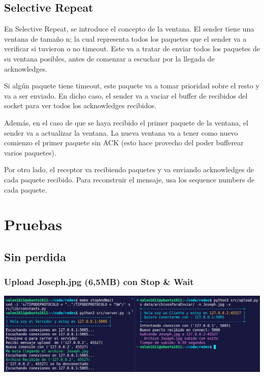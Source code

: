 \documentclass{article}
\begin{document}
\subsection{Selective Repeat}\label{selective-repeat}

En Selective Repeat, se introduce el concepto de la ventana. El sender tiene una ventana de tamaño n; la cual representa todos los paquetes que el sender va a verificar si tuvieron o no timeout. Este va a tratar de enviar todos los paquetes de su ventana posibles, antes de comenzar a escuchar por la llegada de acknowledges.

Si algún paquete tiene timeout, este paquete va a tomar prioridad sobre el resto y va a ser enviado. En dicho caso, el sender va a vaciar el buffer de recibidos del socket para ver todos los acknowledges recibidos.

Además, en el caso de que se haya recibido el primer paquete de la ventana, el sender va a actualizar la ventana. La nueva ventana va a tener como nuevo comienzo el primer paquete sin ACK (esto hace provecho del poder bufferear varios paquetes).

Por otro lado, el receptor va recibiendo paquetes y va enviando acknowledges de cada paquete recibido. Para reconstruir el mensaje, usa los sequence numbers de cada paquete.

\section{\texorpdfstring{\textbf{Pruebas}}{Pruebas}}\label{pruebas-wip}

\subsection{Sin perdida}
\subsubsection{Upload Joseph.jpg (6,5MB) con Stop \& Wait}
\begin{center}
\includegraphics[scale=0.35]{UploadJoseph.jpg(6,5MB)conStopWait}
\end{center}
\end{document}
